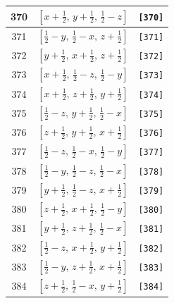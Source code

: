\documentclass[fleqn,8pt]{jsarticle}
\begin{document}
\begin{longtable}{ccc}
370 & $\left[ x + \frac{1}{2},\, y + \frac{1}{2},\, \frac{1}{2} - z \right]$ & {\tt [370]} \\ \hline
371 & $\left[ \frac{1}{2} - y,\, \frac{1}{2} - x,\, z + \frac{1}{2} \right]$ & {\tt [371]} \\ \hline
372 & $\left[ y + \frac{1}{2},\, x + \frac{1}{2},\, z + \frac{1}{2} \right]$ & {\tt [372]} \\ \hline
373 & $\left[ x + \frac{1}{2},\, \frac{1}{2} - z,\, \frac{1}{2} - y \right]$ & {\tt [373]} \\ \hline
374 & $\left[ x + \frac{1}{2},\, z + \frac{1}{2},\, y + \frac{1}{2} \right]$ & {\tt [374]} \\ \hline
375 & $\left[ \frac{1}{2} - z,\, y + \frac{1}{2},\, \frac{1}{2} - x \right]$ & {\tt [375]} \\ \hline
376 & $\left[ z + \frac{1}{2},\, y + \frac{1}{2},\, x + \frac{1}{2} \right]$ & {\tt [376]} \\ \hline
377 & $\left[ \frac{1}{2} - z,\, \frac{1}{2} - x,\, \frac{1}{2} - y \right]$ & {\tt [377]} \\ \hline
378 & $\left[ \frac{1}{2} - y,\, \frac{1}{2} - z,\, \frac{1}{2} - x \right]$ & {\tt [378]} \\ \hline
379 & $\left[ y + \frac{1}{2},\, \frac{1}{2} - z,\, x + \frac{1}{2} \right]$ & {\tt [379]} \\ \hline
380 & $\left[ z + \frac{1}{2},\, x + \frac{1}{2},\, \frac{1}{2} - y \right]$ & {\tt [380]} \\ \hline
381 & $\left[ y + \frac{1}{2},\, z + \frac{1}{2},\, \frac{1}{2} - x \right]$ & {\tt [381]} \\ \hline
382 & $\left[ \frac{1}{2} - z,\, x + \frac{1}{2},\, y + \frac{1}{2} \right]$ & {\tt [382]} \\ \hline
383 & $\left[ \frac{1}{2} - y,\, z + \frac{1}{2},\, x + \frac{1}{2} \right]$ & {\tt [383]} \\ \hline
384 & $\left[ z + \frac{1}{2},\, \frac{1}{2} - x,\, y + \frac{1}{2} \right]$ & {\tt [384]} \\
\end{longtable}
\end{document}
